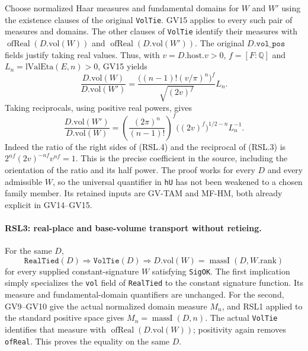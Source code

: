 Choose normalized Haar measures and fundamental domains for $W$ and
$W'$ using the existence clauses of the original \texttt{VolTie}.
GV15 applies to every such pair of measures and domains.  The other
clauses of \texttt{VolTie} identify their measures with
$\operatorname{ofReal}(D.\mathrm{vol}(W))$ and
$\operatorname{ofReal}(D.\mathrm{vol}(W'))$.  The original
$D.\texttt{vol\_pos}$ fields justify taking real values.  Thus, with
$v=D.\mathrm{host}.v>0$, $f=[F:\mathbb Q]$ and
$L_n=\mathrm{lValEta}(E,n)>0$, GV15 yields
\[
 \frac{D.\mathrm{vol}(W)}{D.\mathrm{vol}(W')}
 =\frac{\big((n-1)!(v/\pi)^n\big)^f}{\sqrt{(2v)^f}}L_n.
                                                                  \tag{RSL.3}
\]
Taking reciprocals, using positive real powers, gives
\[
 \boxed{\quad
 \frac{D.\mathrm{vol}(W')}{D.\mathrm{vol}(W)}
   =\left(\frac{(2\pi)^n}{(n-1)!}\right)^f
        \big((2v)^f\big)^{1/2-n}L_n^{-1}.
 \quad}                                                          \tag{RSL.4}
\]
Indeed the ratio of the right sides of (RSL.4) and the reciprocal
of (RSL.3) is $2^{nf}(2v)^{-nf}v^{nf}=1$.
This is the precise coefficient in the source, including the
orientation of the ratio and its half power.  The proof works for
every $D$ and every admissible $W$, so the universal quantifier in
\texttt{hU} has not been weakened to a chosen family member.
Its retained inputs are GV-TAM and MF-HM, both already explicit in
GV14--GV15.

\paragraph{RSL3: real-place and base-volume transport without retieing.}
\label{claim:RSL3}
For the same $D$,
\[
 \texttt{RealTied}(D)\Longrightarrow\texttt{VolTie}(D)
 \Longrightarrow
 D.\mathrm{vol}(W)=\operatorname{massI}(D,W.\mathrm{rank})
                                                                  \tag{RSL.5}
\]
for every supplied constant-signature $W$ satisfying
\texttt{SigOK}.  The first implication simply specializes the
\texttt{vol} field of \texttt{RealTied} to the constant signature
function.  Its measure and fundamental-domain quantifiers are
unchanged.  For the second, GV9--GV10 give the actual normalized
domain measure $M_n$, and RSL1 applied to the standard positive
space gives $M_n=\operatorname{massI}(D,n)$.  The actual
\texttt{VolTie} identifies that measure with
$\operatorname{ofReal}(D.\mathrm{vol}(W))$; positivity again removes
\texttt{ofReal}.  This proves the equality on the same $D$.

